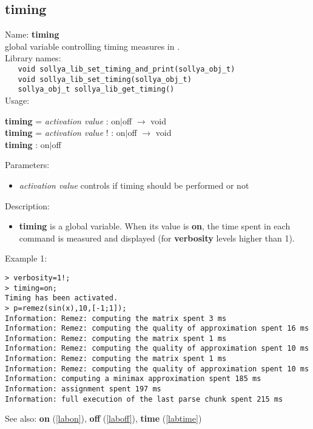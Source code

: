\subsection{timing}
\label{labtiming}
\noindent Name: \textbf{timing}\\
\phantom{aaa}global variable controlling timing measures in \sollya.\\[0.2cm]
\noindent Library names:\\
\verb|   void sollya_lib_set_timing_and_print(sollya_obj_t)|\\
\verb|   void sollya_lib_set_timing(sollya_obj_t)|\\
\verb|   sollya_obj_t sollya_lib_get_timing()|\\[0.2cm]
\noindent Usage: 
\begin{center}
\textbf{timing} = \emph{activation value} : \textsf{on$|$off} $\rightarrow$ \textsf{void}\\
\textbf{timing} = \emph{activation value} ! : \textsf{on$|$off} $\rightarrow$ \textsf{void}\\
\textbf{timing} : \textsf{on$|$off}\\
\end{center}
Parameters: 
\begin{itemize}
\item \emph{activation value} controls if timing should be performed or not
\end{itemize}
\noindent Description: \begin{itemize}

\item \textbf{timing} is a global variable. When its value is \textbf{on}, the time spent in each 
   command is measured and displayed (for \textbf{verbosity} levels higher than 1).
\end{itemize}
\noindent Example 1: 
\begin{center}\begin{minipage}{15cm}\begin{Verbatim}[frame=single]
> verbosity=1!;
> timing=on;
Timing has been activated.
> p=remez(sin(x),10,[-1;1]);
Information: Remez: computing the matrix spent 3 ms
Information: Remez: computing the quality of approximation spent 16 ms
Information: Remez: computing the matrix spent 1 ms
Information: Remez: computing the quality of approximation spent 10 ms
Information: Remez: computing the matrix spent 1 ms
Information: Remez: computing the quality of approximation spent 10 ms
Information: computing a minimax approximation spent 185 ms
Information: assignment spent 197 ms
Information: full execution of the last parse chunk spent 215 ms
\end{Verbatim}
\end{minipage}\end{center}
See also: \textbf{on} (\ref{labon}), \textbf{off} (\ref{laboff}), \textbf{time} (\ref{labtime})

